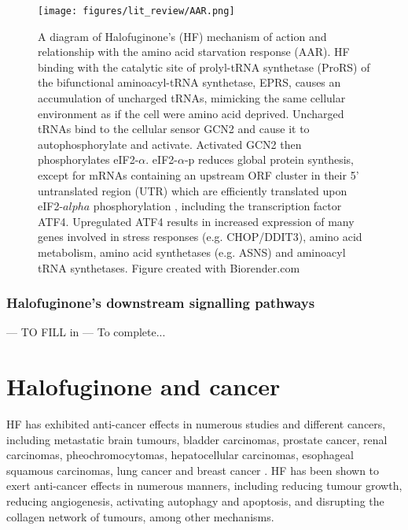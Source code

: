 \begin{figure}[htb]
\centering
\texttt{[image: figures/lit\_review/AAR.png]}
\caption[Halofuginone and the amino acid response diagram]{A diagram of Halofuginone's (HF) mechanism of action and relationship with the amino acid starvation response (AAR).
HF binding with the catalytic site of prolyl-tRNA synthetase (ProRS) of the bifunctional aminoacyl-tRNA synthetase, EPRS, causes an accumulation of uncharged tRNAs, mimicking the same cellular environment as if the cell were amino acid deprived.
Uncharged tRNAs bind to the cellular sensor GCN2 and cause it to autophosphorylate and activate.
Activated GCN2 then phosphorylates eIF2-$\alpha$.
eIF2-$\alpha$-p reduces global protein synthesis, except for mRNAs containing an upstream ORF cluster in their 5' untranslated region (UTR) which are efficiently translated upon eIF2-$alpha$ phosphorylation \cite{ye2015gcn2}, including the transcription factor ATF4.
Upregulated ATF4 results in increased expression of many genes involved in stress responses (e.g. CHOP/DDIT3), amino acid metabolism, amino acid synthetases (e.g. ASNS) and aminoacyl tRNA synthetases.
Figure created with Biorender.com
}
\label{fig:HF_AAR}\end{figure}

\subsubsection{Halofuginone's downstream signalling pathways}
--- TO FILL in ---
To complete...

\section{Halofuginone and cancer}\label{sec:HF_cancer}

HF has exhibited anti-cancer effects in numerous studies and different cancers, including metastatic brain tumours, bladder carcinomas, prostate cancer, renal carcinomas, pheochromocytomas, hepatocellular carcinomas, esophageal squamous carcinomas, lung cancer and breast cancer \cite{abramovitch2004halofuginone, elkin1999inhibition, gavish2002growth, genin2008myofibroblasts, gross2003treatment, nagler2004suppression, wang2020significance, demiroglu2020anticarcinogenic, xia2018halofuginone}.
HF has been shown to exert anti-cancer effects in numerous manners, including reducing tumour growth, reducing angiogenesis, activating autophagy and apoptosis, and disrupting the collagen network of tumours, among other mechanisms.

